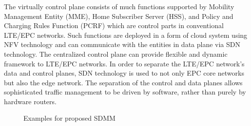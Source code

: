 \documentclass[runningheads,a4paper]{llncs}
\begin{document}
The virtually control plane consists of much functions supported by Mobility Management Entity (MME), Home Subscriber Server (HSS), and Policy and Charging Rules Function (PCRF) which are control parts in conventional LTE/EPC networks. Such functions are deployed in a form of cloud system using NFV technology and can communicate with the entities in data plane via SDN technology. The centralized control plane can provide flexible and dynamic framework to LTE/EPC networks. In order to separate the LTE/EPC network's data and control planes, SDN technology is used to not only EPC core networks but also the edge network. The separation of the control and data planes allows sophisticated traffic management to be driven by software, rather than purely by hardware routers.

\begin{figure}[t] 
\centering 
{}
\caption{Examples for proposed SDMM}
\label{fig:2}
\end{figure}
\end{document}
